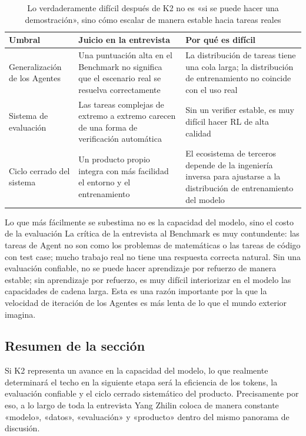 \begin{table}[H]
\centering
\begin{tabular}{p{2.8cm}p{4.2cm}p{4.5cm}}
\toprule
\textbf{Umbral} & \textbf{Juicio en la entrevista} & \textbf{Por qué es difícil} \\
\midrule
Generalización de los Agentes & Una puntuación alta en el Benchmark no significa que el escenario real se resuelva correctamente & La distribución de tareas tiene una cola larga; la distribución de entrenamiento no coincide con el uso real \\
Sistema de evaluación & Las tareas complejas de extremo a extremo carecen de una forma de verificación automática & Sin un verifier estable, es muy difícil hacer RL de alta calidad \\
Ciclo cerrado del sistema & Un producto propio integra con más facilidad el entorno y el entrenamiento & El ecosistema de terceros depende de la ingeniería inversa para ajustarse a la distribución de entrenamiento del modelo \\
\bottomrule
\end{tabular}
\caption{Lo verdaderamente difícil después de K2 no es «si se puede hacer una demostración», sino cómo escalar de manera estable hacia tareas reales}
\end{table}

\begin{warningbox}{Lo que más fácilmente se subestima no es la capacidad del modelo, sino el costo de la evaluación}
La crítica de la entrevista al Benchmark es muy contundente: las tareas de Agent no son como los problemas de matemáticas o las tareas de código con test case; mucho trabajo real no tiene una respuesta correcta natural. Sin una evaluación confiable, no se puede hacer aprendizaje por refuerzo de manera estable; sin aprendizaje por refuerzo, es muy difícil interiorizar en el modelo las capacidades de cadena larga. Esta es una razón importante por la que la velocidad de iteración de los Agentes es más lenta de lo que el mundo exterior imagina.
\end{warningbox}

\subsection{Resumen de la sección}
Si K2 representa un avance en la capacidad del modelo, lo que realmente determinará el techo en la siguiente etapa será la eficiencia de los tokens, la evaluación confiable y el ciclo cerrado sistemático del producto. Precisamente por eso, a lo largo de toda la entrevista Yang Zhilin coloca de manera constante «modelo», «datos», «evaluación» y «producto» dentro del mismo panorama de discusión.


